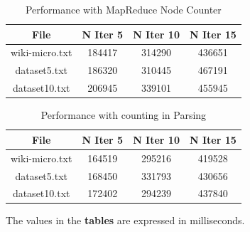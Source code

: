 \begin{table}[H]
\caption{Performance with MapReduce Node Counter}
\centering
\begin{tabular}{c c c c}
\hline\hline
File & N Iter 5 & N Iter 10 & N Iter 15 \\ [0.7ex] %
\hline
wiki-micro.txt&184417&314290&436651\\
dataset5.txt&186320&310445&467191 \\
dataset10.txt&206945&339101&455945 \\ [1ex]
\hline
\end{tabular}
\label{table:nonlin}
\end{table}

\begin{table}[H]
\caption{Performance with counting in Parsing}
\centering
\begin{tabular}{c c c c}
\hline\hline
File & N Iter 5 & N Iter 10 & N Iter 15 \\ [0.7ex] %
\hline
wiki-micro.txt&164519&295216&419528\\
dataset5.txt&168450&331793&430656 \\
dataset10.txt&172402&294239&437840 \\ [1ex]
\hline
\end{tabular}
\label{table:nonlin}
\end{table}

\noindent The values in the \textbf{tables} are expressed in milliseconds.